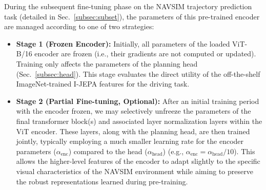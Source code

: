 \documentclass{article}
\begin{document}
During the subsequent fine-tuning phase on the NAVSIM trajectory prediction task (detailed in Sec.~\ref{subsec:subset}), the parameters of this pre-trained encoder are managed according to one of two strategies:
\begin{itemize}
    \item \textbf{Stage 1 (Frozen Encoder):} Initially, all parameters of the loaded ViT-B/16 encoder are frozen (i.e., their gradients are not computed or updated). Training only affects the parameters of the planning head (Sec.~\ref{subsec:head}). This stage evaluates the direct utility of the off-the-shelf ImageNet-trained I-JEPA features for the driving task.
    \item \textbf{Stage 2 (Partial Fine-tuning, Optional):} After an initial training period with the encoder frozen, we may selectively unfreeze the parameters of the final transformer block(s) and associated layer normalization layers within the ViT encoder. These layers, along with the planning head, are then trained jointly, typically employing a much smaller learning rate for the encoder parameters ($\alpha_{\text{enc}}$) compared to the head ($\alpha_{\text{head}}$) (e.g., $\alpha_{\text{enc}} = \alpha_{\text{head}} / 10$). This allows the higher-level features of the encoder to adapt slightly to the specific visual characteristics of the NAVSIM environment while aiming to preserve the robust representations learned during pre-training.
\end{itemize}
\end{document}

